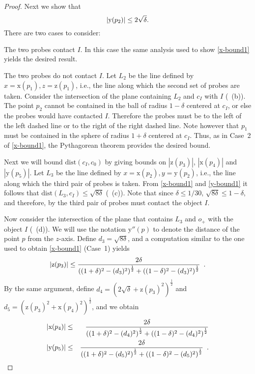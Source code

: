 \documentclass[11pt]{article}
\newcommand{\mysqrt}[1]{\left({#1}\right)^\frac{1}{2}}
\newcommand{\origin}{o_+}
\newcommand{\dist}{\mathrm{dist}}
\newcommand{\x}{\mathrm{x}}
\newcommand{\y}{\mathrm{y}}
\newcommand{\z}{\mathrm{z}}
\newcommand{\ypp}{\mathrm{y''}}
\begin{document}
\begin{proof}
Next we show that 
\begin{equation}
|\y(p_2)|\le2\sqrt\delta.  \eqlabel{y-bound1}
\end{equation}
There are two cases to consider:

 The two probes contact $I$.  In this case the
same analysis used to show \eqref{x-bound1} yields the desired result.

 The two probes do not contact $I$.  Let $L_2$
be the line defined by $x=\x(p_1),z=\z(p_1)$, i.e., the line along
which the second set of probes are taken.  Consider the intersection
of the plane containing $L_2$ and $c_I$ with $I$
(~(b)).  The point $p_2$ cannot be contained
in the ball of radius $1-\delta$ centered at $c_I$, or else the probes
would have contacted $I$.  Therefore the probes must be to the left of
the left dashed line or to the right of the right dashed line.  Note
however that $p_1$ must be contained in the sphere of radius
$1+\delta$ centered at $c_I$.  Thus, as in Case~2 of \eqref{x-bound1},
the Pythagorean theorem provides the desired bound.

Next we will bound $\dist(c_I,c_0)$ by giving bounds on $|\z(p_3)|$,
$|\x(p_4)|$ and $|\y(p_5)|$.  Let $L_3$ be the line defined by
$x=\x(p_2),y=\y(p_2)$, i.e., the line along which the third pair of
probes is taken.  From \eqref{x-bound1} and \eqref{y-bound1} it
follows that $\dist(L_3,c_I)\le \sqrt{8\delta}$
(~(c)).  Note that since $\delta\le 1/30$,
$\sqrt{8\delta}\le1-\delta$, and therefore, by  the third
pair of probes must contact the object $I$.

Now consider the intersection of the plane that contains $L_3$ and
$\origin$ with the object $I$ (~(d)).  We will use the
notation $\ypp(p)$ to denote the distance of the point $p$ from the
$z$-axis.  Define $d_3=\sqrt{8\delta}$, and a computation similar to
the one used to obtain \eqref{x-bound1} (Case~1) yields
\begin{equation}
|\z(p_3)| \le \frac{2\delta}
             {\mysqrt{(1+\delta)^2-(d_3)^2} 
              + \mysqrt{(1-\delta)^2-(d_3)^2}} \enspace.
\eqlabel{z-bound2}
\end{equation}
By the same argument, define $d_4=\mysqrt{2\sqrt{\delta}+\z(p_3)^2}$ and 
$d_5=\mysqrt{\z(p_3)^2+\x(p_4)^2}$, and we obtain
\begin{eqnarray}
|\x(p_4)| & \le & \frac{2\delta}
             {\mysqrt{(1+\delta)^2-(d_4)^2}
             + \mysqrt{(1-\delta)^2-(d_4)^2}}
\eqlabel{x-bound2} \\
|\y(p_5)| & \le & \frac{2\delta}
             {\mysqrt{(1+\delta)^2-(d_5)^2} 
             + \mysqrt{(1-\delta)^2-(d_5)^2}} \enspace .
\eqlabel{y-bound2}
\end{eqnarray}


\end{proof}
\end{document}
